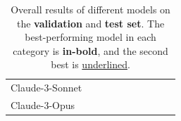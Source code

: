\begin{table}[hbt!]
\begin{tabular}{@{}lccccccccc@{}}
%
 Claude-3-Sonnet  &  &  &  &  & &  &     \\

Claude-3-Opus  &  &  &  &  & &  &     \\


\bottomrule
\end{tabular}%
\caption{Overall results of different models on the \data \textbf{validation} and \textbf{test set}. The best-performing model in each category is \textbf{in-bold}, and the second best is {\ul{underlined}}.}
\label{tab:detail}
\end{table}









